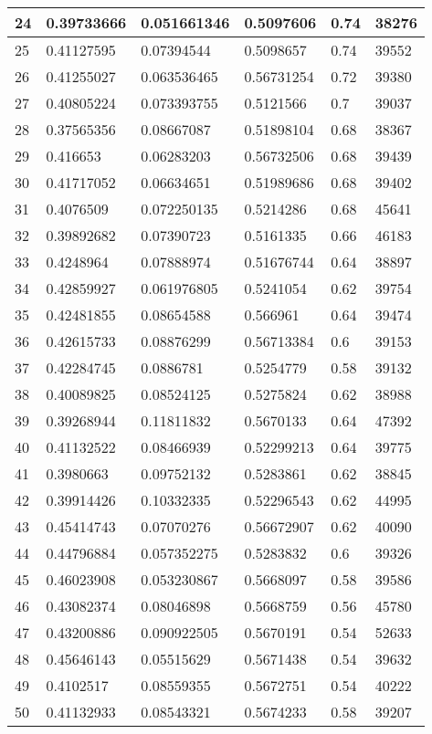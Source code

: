 \begin{longtable}{|l|l|l|l|l|l|}
24 & 0.39733666 & 0.051661346 & 0.5097606 & 0.74 & 38276 \\ \hline 
25 & 0.41127595 & 0.07394544 & 0.5098657 & 0.74 & 39552 \\ \hline 
26 & 0.41255027 & 0.063536465 & 0.56731254 & 0.72 & 39380 \\ \hline 
27 & 0.40805224 & 0.073393755 & 0.5121566 & 0.7 & 39037 \\ \hline 
28 & 0.37565356 & 0.08667087 & 0.51898104 & 0.68 & 38367 \\ \hline 
29 & 0.416653 & 0.06283203 & 0.56732506 & 0.68 & 39439 \\ \hline 
30 & 0.41717052 & 0.06634651 & 0.51989686 & 0.68 & 39402 \\ \hline 
31 & 0.4076509 & 0.072250135 & 0.5214286 & 0.68 & 45641 \\ \hline 
32 & 0.39892682 & 0.07390723 & 0.5161335 & 0.66 & 46183 \\ \hline 
33 & 0.4248964 & 0.07888974 & 0.51676744 & 0.64 & 38897 \\ \hline 
34 & 0.42859927 & 0.061976805 & 0.5241054 & 0.62 & 39754 \\ \hline 
35 & 0.42481855 & 0.08654588 & 0.566961 & 0.64 & 39474 \\ \hline 
36 & 0.42615733 & 0.08876299 & 0.56713384 & 0.6 & 39153 \\ \hline 
37 & 0.42284745 & 0.0886781 & 0.5254779 & 0.58 & 39132 \\ \hline 
38 & 0.40089825 & 0.08524125 & 0.5275824 & 0.62 & 38988 \\ \hline 
39 & 0.39268944 & 0.11811832 & 0.5670133 & 0.64 & 47392 \\ \hline 
40 & 0.41132522 & 0.08466939 & 0.52299213 & 0.64 & 39775 \\ \hline 
41 & 0.3980663 & 0.09752132 & 0.5283861 & 0.62 & 38845 \\ \hline 
42 & 0.39914426 & 0.10332335 & 0.52296543 & 0.62 & 44995 \\ \hline 
43 & 0.45414743 & 0.07070276 & 0.56672907 & 0.62 & 40090 \\ \hline 
44 & 0.44796884 & 0.057352275 & 0.5283832 & 0.6 & 39326 \\ \hline 
45 & 0.46023908 & 0.053230867 & 0.5668097 & 0.58 & 39586 \\ \hline 
46 & 0.43082374 & 0.08046898 & 0.5668759 & 0.56 & 45780 \\ \hline 
47 & 0.43200886 & 0.090922505 & 0.5670191 & 0.54 & 52633 \\ \hline 
48 & 0.45646143 & 0.05515629 & 0.5671438 & 0.54 & 39632 \\ \hline 
49 & 0.4102517 & 0.08559355 & 0.5672751 & 0.54 & 40222 \\ \hline 
50 & 0.41132933 & 0.08543321 & 0.5674233 & 0.58 & 39207 \\ \hline 
\end{longtable}